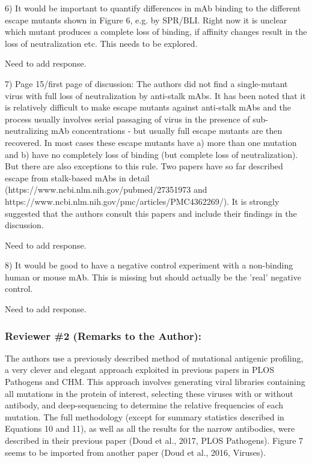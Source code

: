 \documentclass[11pt, oneside]{article}   	%
\begin{document}
6) It would be important to quantify differences in mAb binding to the different escape mutants shown in Figure 6, e.g. by SPR/BLI. Right now it is unclear which mutant produces a complete loss of binding, if affinity changes result in the loss of neutralization etc. This needs to be explored.

{\color{red}
Need to add response.}

7) Page 15/first page of discussion: The authors did not find a single-mutant virus with full loss of neutralization by anti-stalk mAbs. It has been noted that it is relatively difficult to make escape mutants against anti-stalk mAbs and the process usually involves serial passaging of virus in the presence of sub-neutralizing mAb concentrations - but usually full escape mutants are then recovered. In most cases these escape mutants have a) more than one mutation and b) have no completely loss of binding (but complete loss of neutralization). But there are also exceptions to this rule. Two papers have so far described escape from stalk-based mAbs in detail (https://www.ncbi.nlm.nih.gov/pubmed/27351973 and https://www.ncbi.nlm.nih.gov/pmc/articles/PMC4362269/). It is strongly suggested that the authors consult this papers and include their findings in the discussion.

{\color{red}
Need to add response.}

8) It would be good to have a negative control experiment with a non-binding human or mouse mAb. This is missing but should actually be the 'real' negative control.

{\color{red}
Need to add response.}

\subsubsection*{Reviewer \#2 (Remarks to the Author):}

The authors use a previously described method of mutational antigenic profiling, a very clever and elegant approach exploited in previous papers in PLOS Pathogens and CHM. This approach involves generating viral libraries containing all mutations in the protein of interest, selecting these viruses with or without antibody, and deep-sequencing to determine the relative frequencies of each mutation. The full methodology (except for summary statistics described in Equations 10 and 11), as well as all the results for the narrow antibodies, were described in their previous paper (Doud et al., 2017, PLOS Pathogens). Figure 7 seems to be imported from another paper (Doud et al., 2016, Viruses).
\end{document}
